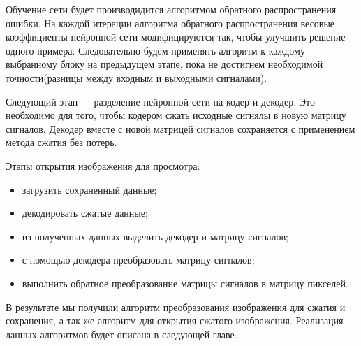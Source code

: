Обучение сети будет производидится алгоритмом обратного распространения ошибки. На каждой итерации алгоритма обратного распространения
весовые коэффициенты нейронной сети модифицируются так, чтобы улучшить решение одного примера. Следовательно будем применять алгоритм к
каждому выбранному блоку на предыдущем этапе, пока не достигнем необходимой точности(разницы между входным и выходными сигналами).

Следующий этап --- разделение нейронной сети на кодер и декодер. Это необходимо для того, чтобы кодером сжать исходные сигнялы в новую матрицу сигналов.
Декодер вместе с новой матрицей сигналов сохраняется с применением метода сжатия без потерь.

Этапы открытия изображения для просмотра:
\begin{itemize}
  \item загрузить сохраненный данные;
  \item декодировать сжатые данные;
  \item из полученных данных выделить декодер и матрицу сигналов;
  \item с помощью декодера преобразовать матрицу сигналов;
  \item выполнить обратное преобразование матрицы сигналов в матрицу пикселей.
\end{itemize}

В результате мы получили алгоритм преобразования изображения для сжатия и сохранения,
а так же алгоритм для открытия сжатого изображения. Реализация данных алгоритмов будет описана в следующей главе.
